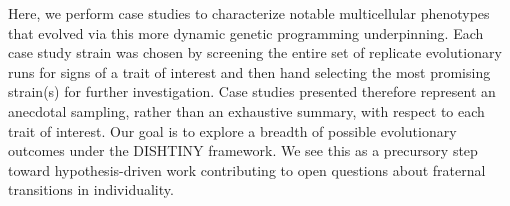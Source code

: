 Here, we perform case studies to characterize notable multicellular phenotypes that evolved via this more dynamic genetic programming underpinning.
Each case study strain was chosen by screening the entire set of replicate evolutionary runs for signs of a trait of interest and then hand selecting the most promising strain(s) for further investigation.
Case studies presented therefore represent an anecdotal sampling, rather than an exhaustive summary, with respect to each trait of interest.
Our goal is to explore a breadth of possible evolutionary outcomes under the DISHTINY framework.
We see this as a precursory step toward hypothesis-driven work contributing to open questions about fraternal transitions in individuality.
